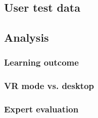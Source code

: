\subsection{User test data}






\subsection{Analysis}

\subsubsection{Learning outcome}

\subsubsection{VR mode vs. desktop}

\subsubsection{Expert evaluation}


\cleardoublepage